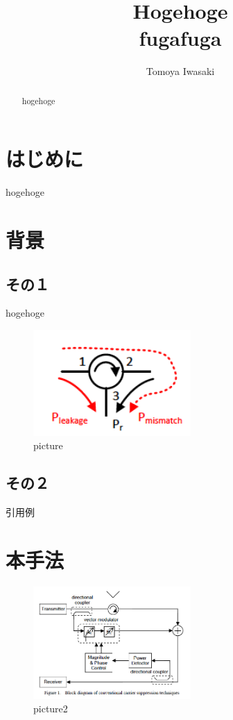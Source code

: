 \documentclass[a4j,pt]{jsarticle}
\begin{document}

\title{Hogehoge \\ fugafuga}

\author{
   Tomoya Iwasaki 
}

\begin{abstract}
hogehoge
\end{abstract}

\maketitle
\thispagestyle{empty}

\section{はじめに}
hogehoge


\section{背景}

\subsection{その１}

hogehoge\cite{example}
\begin{figure}[htbp]
    \begin{center}
        \includegraphics[width=6cm]{circulator.png}
        \caption{picture}
        \label{sample}
    \end{center}
\end{figure}

\subsection{その２}
引用例\cite{example}





\section{本手法}

\begin{figure}[htbp]
    \begin{center}
        \includegraphics[width=6cm]{diagram_VectorModulation.png}
        \caption{picture2}
        \label{sample}
    \end{center}
\end{figure}




\end{document}

